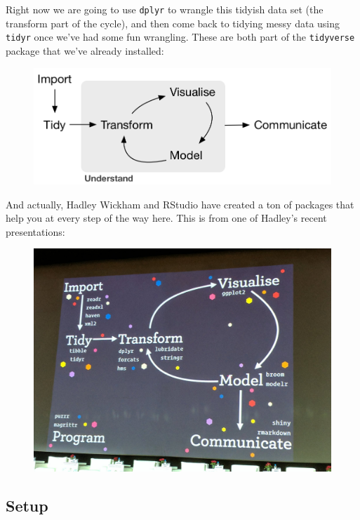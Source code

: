 \documentclass[]{book}
\theoremstyle{definition}
\theoremstyle{definition}
\theoremstyle{definition}
\theoremstyle{remark}
\begin{document}
Right now we are going to use \texttt{dplyr} to wrangle this tidyish
data set (the transform part of the cycle), and then come back to
tidying messy data using \texttt{tidyr} once we've had some fun
wrangling. These are both part of the \texttt{tidyverse} package that
we've already installed:

\begin{figure}[htbp]
\centering
\includegraphics{img/r4ds_data-science.png}
\caption{}
\end{figure}

And actually, Hadley Wickham and RStudio have created a ton of packages
that help you at every step of the way here. This is from one of
Hadley's recent presentations:

\begin{figure}[htbp]
\centering
\includegraphics{img/tidyverse_wickham_pres.jpg}
\caption{}
\end{figure}

\subsection{Setup}\label{setup}
\end{document}
